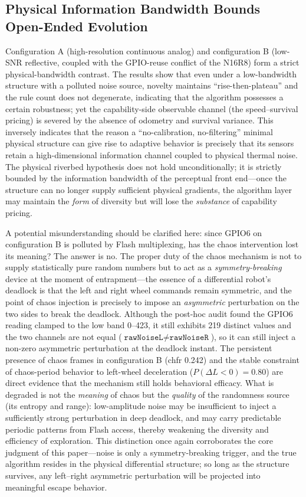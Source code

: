 \documentclass[11pt]{article}
\begin{document}
\subsection{Physical Information Bandwidth Bounds Open-Ended Evolution}
Configuration A (high-resolution continuous analog) and configuration B (low-SNR reflective, coupled with the GPIO-reuse conflict of the N16R8) form a strict physical-bandwidth contrast. The results show that even under a low-bandwidth structure with a polluted noise source, novelty maintains ``rise-then-plateau'' and the rule count does not degenerate, indicating that the algorithm possesses a certain robustness; yet the capability-side observable channel (the speed--survival pricing) is severed by the absence of odometry and survival variance. This inversely indicates that the reason a ``no-calibration, no-filtering'' minimal physical structure can give rise to adaptive behavior is precisely that its sensors retain a high-dimensional information channel coupled to physical thermal noise. The physical riverbed hypothesis does not hold unconditionally; it is strictly bounded by the information bandwidth of the perceptual front end---once the structure can no longer supply sufficient physical gradients, the algorithm layer may maintain the \emph{form} of diversity but will lose the \emph{substance} of capability pricing.

A potential misunderstanding should be clarified here: since GPIO6 on configuration B is polluted by Flash multiplexing, has the chaos intervention lost its meaning? The answer is no. The proper duty of the chaos mechanism is not to supply statistically pure random numbers but to act as a \emph{symmetry-breaking} device at the moment of entrapment---the essence of a differential robot's deadlock is that the left and right wheel commands remain symmetric, and the point of chaos injection is precisely to impose an \emph{asymmetric} perturbation on the two sides to break the deadlock. Although the post-hoc audit found the GPIO6 reading clamped to the low band 0--423, it still exhibits 219 distinct values and the two channels are not equal ($\texttt{rawNoiseL} \ne \texttt{rawNoiseR}$), so it can still inject a non-zero asymmetric perturbation at the deadlock instant. The persistent presence of chaos frames in configuration B (chfr 0.242) and the stable constraint of chaos-period behavior to left-wheel deceleration ($P(\Delta L<0)=0.80$) are direct evidence that the mechanism still holds behavioral efficacy. What is degraded is not the \emph{meaning} of chaos but the \emph{quality} of the randomness source (its entropy and range): low-amplitude noise may be insufficient to inject a sufficiently strong perturbation in deep deadlock, and may carry predictable periodic patterns from Flash access, thereby weakening the diversity and efficiency of exploration. This distinction once again corroborates the core judgment of this paper---noise is only a symmetry-breaking trigger, and the true algorithm resides in the physical differential structure; so long as the structure survives, any left--right asymmetric perturbation will be projected into meaningful escape behavior.
\end{document}
